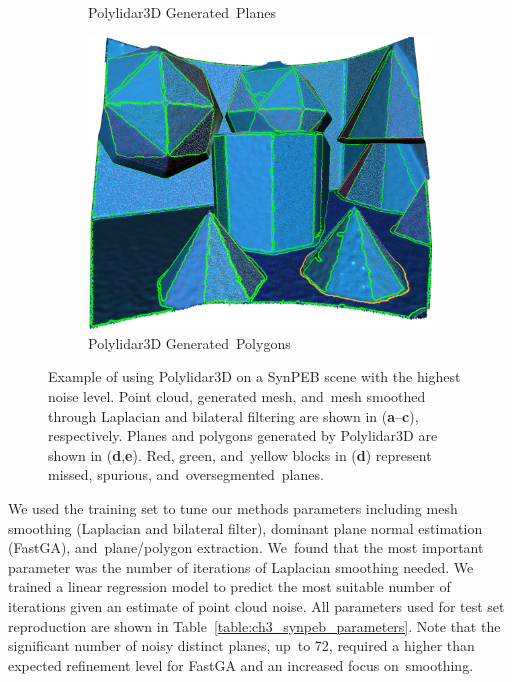 \begin{figure}[ht]
\begin{subfigure}[t]{.45\linewidth}
    \caption{\label{fig:ch3_synpeb_d}Polylidar3D Generated~Planes}
  \end{subfigure}
  \hspace{1cm}
  \begin{subfigure}[t]{.45\linewidth}
    \centering\includegraphics[width=.75\linewidth]{chapter_3_polylidar3d/imgs/synpeb_var4_polygons_raw.png}
    \caption{\label{fig:ch3_synpeb_e}Polylidar3D Generated~Polygons}
  \end{subfigure}
  \caption[Example of using Polylidar3D on a SynPEB scene with the highest noise level]{Example of using Polylidar3D on a SynPEB scene with the highest noise level. Point cloud, generated mesh, and~mesh  smoothed through Laplacian and bilateral filtering are shown in (\textbf{a}--\textbf{c}), respectively.  Planes and polygons generated by Polylidar3D are shown in (\textbf{d},\textbf{e}). Red, green, and~yellow blocks in (\textbf{d}) represent missed, spurious, and~oversegmented~planes.}\label{fig:ch3_synpeb_pics}
\end{figure}

We used the training set to tune our methods parameters including mesh smoothing (Laplacian and bilateral filter), dominant plane normal estimation (FastGA), and~plane/polygon extraction. We~found that the most important parameter was the number of iterations of Laplacian smoothing needed. We trained a linear regression model to predict the most suitable number of iterations given an estimate of point cloud noise. All parameters used for test set reproduction are shown in Table~\ref{table:ch3_synpeb_parameters}. Note that the significant number of noisy distinct planes, up~to 72, required a higher than expected refinement level for FastGA and an increased focus on~smoothing.


